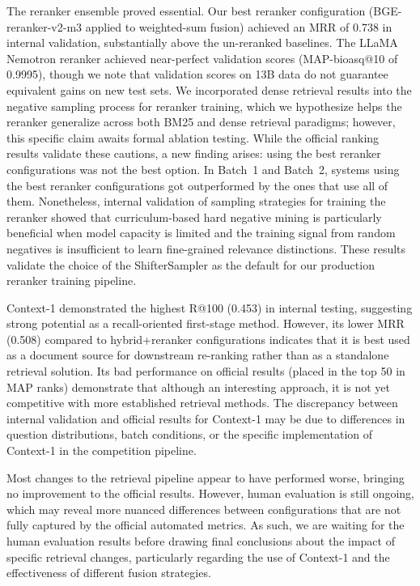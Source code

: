 The reranker ensemble proved essential. Our best reranker configuration (BGE-reranker-v2-m3 applied to weighted-sum fusion) achieved an MRR of 0.738 in internal validation, substantially above the un-reranked baselines. The LLaMA Nemotron reranker achieved near-perfect validation scores (MAP-bioasq@10 of 0.9995), though we note that validation scores on 13B data do not guarantee equivalent gains on new test sets. We incorporated dense retrieval results into the negative sampling process for reranker training, which we hypothesize helps the reranker generalize across both BM25 and dense retrieval paradigms; however, this specific claim awaits formal ablation testing. While the official ranking results validate these cautions, a new finding arises: using the best reranker configurations was not the best option. In Batch~1 and Batch~2, systems using the best reranker configurations got outperformed by the ones that use all of them. Nonetheless, internal validation of sampling strategies for training the reranker showed that curriculum-based hard negative mining is particularly beneficial when model capacity is limited and the training signal from random negatives is insufficient to learn fine-grained relevance distinctions. These results validate the choice of the ShifterSampler as the default for our production reranker training pipeline.

Context-1 demonstrated the highest R@100 (0.453) in internal testing, suggesting strong potential as a recall-oriented first-stage method. However, its lower MRR (0.508) compared to hybrid+reranker configurations indicates that it is best used as a document source for downstream re-ranking rather than as a standalone retrieval solution. Its bad performance on official results (placed in the top 50 in MAP ranks) demonstrate that although an interesting approach, it is not yet competitive with more established retrieval methods. The discrepancy between internal validation and official results for Context-1 may be due to differences in question distributions, batch conditions, or the specific implementation of Context-1 in the competition pipeline.

Most changes to the retrieval pipeline appear to have performed worse, bringing no improvement to the official results. However, human evaluation is still ongoing, which may reveal more nuanced differences between configurations that are not fully captured by the official automated metrics. As such, we are waiting for the human evaluation results before drawing final conclusions about the impact of specific retrieval changes, particularly regarding the use of Context-1 and the effectiveness of different fusion strategies.

